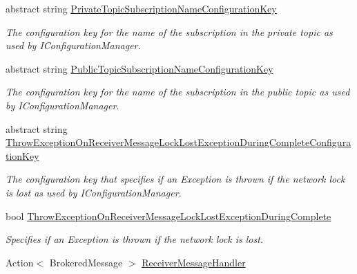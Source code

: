 \begin{DoxyCompactItemize}
abstract string \hyperlink{classCqrs_1_1Azure_1_1ServiceBus_1_1AzureServiceBus_adb82030e0e3ba17347e7fd6a2c68fc91_adb82030e0e3ba17347e7fd6a2c68fc91}{Private\+Topic\+Subscription\+Name\+Configuration\+Key}
\begin{DoxyCompactList}\small\item\em The configuration key for the name of the subscription in the private topic as used by I\+Configuration\+Manager. \end{DoxyCompactList}\item 
abstract string \hyperlink{classCqrs_1_1Azure_1_1ServiceBus_1_1AzureServiceBus_afd2996c47ea248fd1b70ad8077dcd215_afd2996c47ea248fd1b70ad8077dcd215}{Public\+Topic\+Subscription\+Name\+Configuration\+Key}
\begin{DoxyCompactList}\small\item\em The configuration key for the name of the subscription in the public topic as used by I\+Configuration\+Manager. \end{DoxyCompactList}\item 
abstract string \hyperlink{classCqrs_1_1Azure_1_1ServiceBus_1_1AzureServiceBus_a29a4fb4d6f85c649e699cd5e7f0b4d1d_a29a4fb4d6f85c649e699cd5e7f0b4d1d}{Throw\+Exception\+On\+Receiver\+Message\+Lock\+Lost\+Exception\+During\+Complete\+Configuration\+Key}
\begin{DoxyCompactList}\small\item\em The configuration key that specifies if an Exception is thrown if the network lock is lost as used by I\+Configuration\+Manager. \end{DoxyCompactList}\item 
bool \hyperlink{classCqrs_1_1Azure_1_1ServiceBus_1_1AzureServiceBus_afd7c5f3b9caa1ce88bcd8be049bbf099_afd7c5f3b9caa1ce88bcd8be049bbf099}{Throw\+Exception\+On\+Receiver\+Message\+Lock\+Lost\+Exception\+During\+Complete}
\begin{DoxyCompactList}\small\item\em Specifies if an Exception is thrown if the network lock is lost. \end{DoxyCompactList}\item 
Action$<$ Brokered\+Message $>$ \hyperlink{classCqrs_1_1Azure_1_1ServiceBus_1_1AzureServiceBus_ab662579a9bd5be761a23f43e739ff288_ab662579a9bd5be761a23f43e739ff288}{Receiver\+Message\+Handler}

\end{DoxyCompactItemize}
